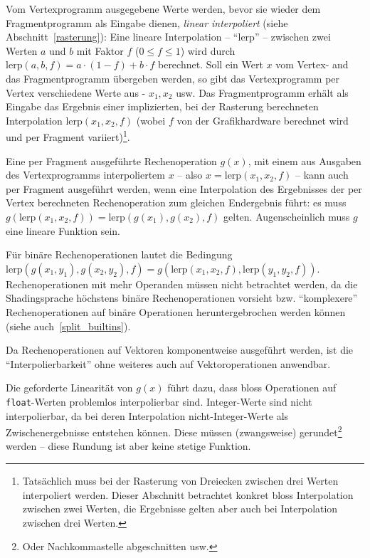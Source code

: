 \documentclass[twoside,a4paper,fleqn,12pt]{book}
\begin{document}
\newcommand\lerp{\mathrm{lerp}}
Vom Vertexprogramm ausgegebene Werte werden, bevor sie wieder dem Fragmentprogramm als Eingabe dienen, \emph{linear interpoliert} (siehe Abschnitt~\ref{rasterung}):
Eine lineare Interpolation -- "`$\lerp$"' -- zwischen zwei Werten $a$ und $b$ mit Faktor $f$ ($0 \le f \le 1$) wird durch $\lerp(a, b, f) = a \cdot (1-f) + b \cdot f$ berechnet.
Soll ein Wert $x$ vom Vertex- and das Fragmentprogramm übergeben werden, so gibt das Vertexprogramm per Vertex verschiedene Werte aus - $x_1, x_2$ usw.
Das Fragmentprogramm erhält als Eingabe das Ergebnis einer implizierten, bei der Rasterung berechneten Interpolation $\lerp(x_1, x_2, f)$ (wobei $f$ von der Grafikhardware berechnet wird
und per Fragment variiert)\footnote{Tatsächlich muss bei der Rasterung von Dreiecken zwischen drei Werten interpoliert werden. Dieser Abschnitt betrachtet konkret
bloss Interpolation zwischen zwei Werten, die Ergebnisse gelten aber auch bei Interpolation zwischen drei Werten.}.

Eine per Fragment ausgeführte Rechenoperation $g(x)$, mit einem aus Ausgaben des Vertexprogramms interpoliertem $x$ -- also $x = \lerp(x_1, x_2, f)$ --
kann auch per Fragment ausgeführt werden, wenn eine Interpolation des Ergebnisses der per Vertex berechneten Rechenoperation zum gleichen Endergebnis führt:
es muss $g(\lerp(x_1, x_2, f)) = \lerp (g(x_1), g(x_2), f)$ gelten. Augenscheinlich muss $g$ eine lineare Funktion sein.

Für binäre Rechenoperationen lautet die Bedingung $\lerp (g (x_1, y_1), g (x_2, y_2), f) = g (\lerp (x_1, x_2, f), \lerp (y_1, y_2, f))$.
Rechenoperationen mit mehr Operanden müssen nicht betrachtet werden, da die Shadingsprache höchstens
binäre Rechenoperationen vorsieht bzw. "`komplexere"' Rechenoperationen auf binäre Operationen heruntergebrochen werden
können (siehe auch~\ref{split_builtins}). %

Da Rechenoperationen auf Vektoren komponentweise ausgeführt werden,  ist die "`Interpolierbarkeit"' ohne weiteres auch auf Vektoroperationen anwendbar.

Die geforderte Linearität von $g(x)$ führt dazu, dass bloss Operationen auf \texttt{float}-Werten problemlos interpolierbar sind.
Integer-Werte sind nicht interpolierbar, da bei deren Interpolation nicht-Integer-Werte als Zwischenergebnisse entstehen können.
Diese müssen (zwangsweise) gerundet\footnote{Oder Nachkommastelle abgeschnitten usw.} werden -- diese Rundung
ist aber keine stetige Funktion.
\end{document}
